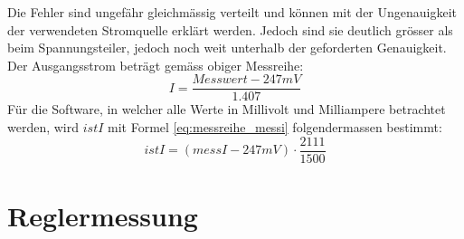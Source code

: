 Die Fehler sind ungefähr gleichmässig verteilt und können mit der Ungenauigkeit der verwendeten Stromquelle erklärt werden. Jedoch sind sie deutlich grösser als beim Spannungsteiler, jedoch noch weit unterhalb der geforderten Genauigkeit. Der Ausgangsstrom beträgt gemäss obiger Messreihe:
\begin{equation}
	I=\frac{Messwert-247mV}{1.407}
\label{eq:messreihe_messi}
\end{equation}
Für die Software, in welcher alle Werte in Millivolt und Milliampere betrachtet werden, wird $istI$ mit Formel \ref{eq:messreihe_messi} folgendermassen bestimmt:
\begin{equation}
	istI=\left(messI-247mV\right)\cdot\frac{2111}{1500}
\label{eq:messreihe_messi_sw}
\end{equation}



\newpage
\section{Reglermessung}\label{ValidMeas}


